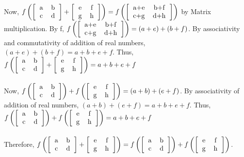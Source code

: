 \documentclass[11pt]{amsart}
\begin{document}
\\Now, $f\left({\left[{ \begin{tabular}{c c}  a & b\\ c & d\end{tabular}}\right]}+{\left[{ \begin{tabular}{c c}  e & f\\ g & h\end{tabular}}\right]}\right)=f\left({\left[{ \begin{tabular}{c c}  a+e & b+f\\ c+g & d+h\end{tabular}}\right]}\right)$ by Matrix multiplication. By f, $f\left({\left[{ \begin{tabular}{c c}  a+e & b+f\\ c+g & d+h\end{tabular}}\right]}\right)=(a+e)+(b+f)$. By associativity and commutativity of addition of real numbers, $(a+e)+(b+f)= a+b+e+f$. Thus, $f\left({\left[{ \begin{tabular}{c c}  a & b\\ c & d\end{tabular}}\right]}+{\left[{ \begin{tabular}{c c}  e & f\\ g & h\end{tabular}}\right]}\right)=a+b+e+f$\\
\\Now, $f\left({\left[{ \begin{tabular}{c c}  a & b\\ c & d\end{tabular}}\right]}\right)+f\left({\left[{ \begin{tabular}{c c}  e & f\\ g & h\end{tabular}}\right]}\right)=(a+b)+(e+f)$. By associativity of addition of real numbers, $(a+b)+(e+f)=a+b+e+f$. Thus, $f\left({\left[{ \begin{tabular}{c c}  a & b\\ c & d\end{tabular}}\right]}\right)+f\left({\left[{ \begin{tabular}{c c}  e & f\\ g & h\end{tabular}}\right]}\right)=a+b+e+f$\\
\\Therefore, $f\left({\left[{ \begin{tabular}{c c}  a & b\\ c & d\end{tabular}}\right]}+{\left[{ \begin{tabular}{c c}  e & f\\ g & h\end{tabular}}\right]}\right)=f\left({\left[{ \begin{tabular}{c c}  a & b\\ c & d\end{tabular}}\right]}\right)+f\left({\left[{ \begin{tabular}{c c}  e & f\\ g & h\end{tabular}}\right]}\right)$.\\
\end{document}
